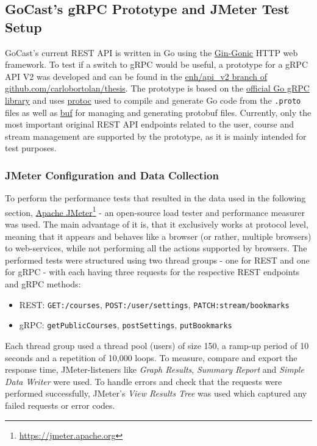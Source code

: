 \subsection{GoCast's gRPC Prototype and JMeter Test Setup}

GoCast's current REST \ac{API} is written in Go using the \href{https://github.com/gin-gonic/gin}{Gin-Gonic} HTTP web framework. To test if a switch to gRPC would be useful, a prototype for a gRPC \ac{API} V2 was developed and can be found in the \href{https://github.com/carlobortolan/thesis/tree/enh/api\_v2}{enh/api\_v2 branch of github.com/carlobortolan/thesis}.
The prototype is based on the \href{https://google.golang.org/grpc}{official Go gRPC library} and uses \href{https://github.com/protocolbuffers/protobuf}{protoc} used to compile and generate Go code from the \texttt{.proto} files as well as \href{https://github.com/bufbuild/buf}{buf} for managing and generating protobuf files. Currently, only the most important original REST \ac{API} endpoints related to the user, course and stream management are supported by the prototype, as it is mainly intended for test purposes.

\subsubsection{JMeter Configuration and Data Collection}

To perform the performance tests that resulted in the data used in the following section, \href{https://jmeter.apache.org}{Apache JMeter}\footnote{\url{https://jmeter.apache.org}} - an open-source load tester and performance measurer was used. The main advantage of it is, that it exclusively works at protocol level, meaning that it appears and behaves like a browser (or rather, multiple browsers) to web-services, while not performing all the actions supported by browsers. The performed tests were structured using two thread groups - one for REST and one for gRPC - with each having three requests for the respective REST endpoints and gRPC methods:
\begin{itemize}
    \item REST: \texttt{GET:/courses}, \texttt{POST:/user/settings}, \texttt{PATCH:stream/bookmarks}
    \item gRPC: \texttt{getPublicCourses}, \texttt{postSettings}, \texttt{putBookmarks}
\end{itemize}
\break
Each thread group used a thread pool (users) of size 150, a ramp-up period of 10 seconds and a repetition of 10,000 loops.
To measure, compare and export the response time, JMeter-listeners like \textit{Graph Results}, \textit{Summary Report} and \textit{Simple Data Writer} were used. To handle errors and check that the requests were performed successfully, JMeter’s \textit{View Results Tree} was used which captured any failed requests or error codes.

